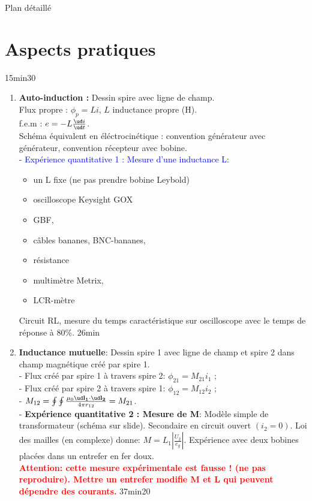 \begin{reportBlock}{Plan détaillé}
\section{Aspects pratiques} 15min30
\begin{enumerate}
    \item \textbf{Auto-induction :} Dessin spire avec ligne de champ. \\
    Flux propre : $\phi_p = L i$, $L$ inductance propre (H). \\
    f.e.m : $e = - L \frac{\ud i}{\ud t}$. \\
    Schéma équivalent en éléctrocinétique : convention générateur avec générateur, convention récepteur avec bobine. \\
    - \textcolor{blue}{Expérience quantitative 1 : Mesure d'une inductance L}: 
    \begin{itemize}
        \item un L fixe (ne pas prendre bobine Leybold)
        \item oscilloscope Keysight GOX
        \item GBF,
        \item câbles bananes, BNC-bananes,
        \item résistance
        \item multimètre Metrix,
        \item LCR-mètre
    \end{itemize}
    Circuit RL, mesure du temps caractéristique sur oscilloscope avec le temps de réponse à 80\%.
    26min
    \item \textbf{Inductance mutuelle}: Dessin spire 1 avec ligne de champ et spire 2 dans champ magnétique créé par spire 1. \\
    - Flux créé par spire 1 à travers spire 2: $\phi_{21} = M_{21} i_1$ ; \\
    - Flux créé par spire 2 à travers spire 1: $\phi_{12} = M_{12} i_2$ ; \\
    - $M_{12} = \oint \oint \frac{\mu_0 \ud \mathbf{l_1} \cdot \ud \mathbf{l_2}}{4 \pi r_{12}} = M_{21}$. \\
     - \textbf{Expérience quantitative 2 : Mesure de M}: Modèle simple de transformateur (schéma sur slide). Secondaire en circuit ouvert $(i_2 = 0)$. Loi des mailles (en complexe) donne: $ M = L_1 \left| \frac{U_2}{e_g} \right|$. Expérience avec deux bobines placées dans un entrefer en fer doux. \\
     \textbf{\textcolor{red}{Attention: cette mesure expérimentale est fausse ! (ne pas reproduire). Mettre un entrefer modifie M et L qui peuvent dépendre des courants.}}
     \newline 37min20
\end{enumerate}


\end{reportBlock}
